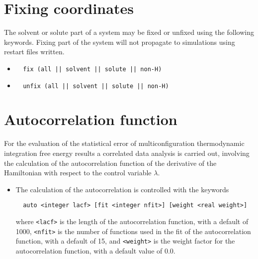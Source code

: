 \section{Fixing coordinates}
The solvent or solute part of a system may be fixed or unfixed using
the following keywords. Fixing part of the system will not propagate to
simulations using restart files written.
\begin{itemize}
\item
\begin{verbatim}
  fix (all || solvent || solute || non-H)
\end{verbatim}
\item
\begin{verbatim}
  unfix (all || solvent || solute || non-H)
\end{verbatim}
\end{itemize}

\section{Autocorrelation function}
For the evaluation of the statistical error of multiconfiguration
thermodynamic integration free energy results a correlated data 
analysis is carried out, involving the calculation of the
autocorrelation function of the derivative of the Hamiltonian with
respect to the control variable $\lambda$.
\begin{itemize}
\item 
The calculation of the autocorrelation is controlled with the keywords
\begin{verbatim}
  auto <integer lacf> [fit <integer nfit>] [weight <real weight>]
\end{verbatim}
where \verb+<lacf>+ is the length of the autocorrelation function, with
a default of 1000, \verb+<nfit>+ is the number of functions used in the
fit of the autocorrelation function, with a default of 15, and
\verb+<weight>+ is the weight factor for the autocorrelation function,
with a default value of 0.0.
\end{itemize}


